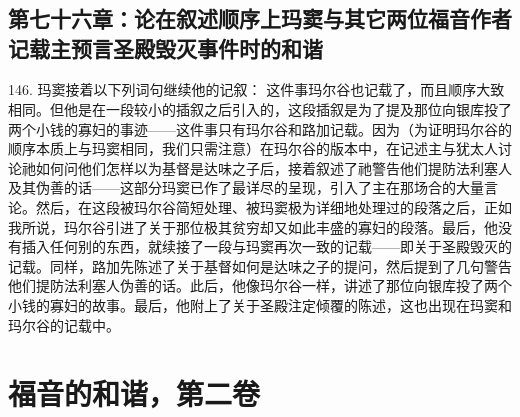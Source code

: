 
\section{}


\subsection{第七十六章：论在叙述顺序上玛窦与其它两位福音作者记载主预言圣殿毁灭事件时的和谐}

146. 玛窦接着以下列词句继续他的记叙： 这件事玛尔谷也记载了，而且顺序大致相同。但他是在一段较小的插叙之后引入的，这段插叙是为了提及那位向银库投了两个小钱的寡妇的事迹——这件事只有玛尔谷和路加记载。因为（为证明玛尔谷的顺序本质上与玛窦相同，我们只需注意）在玛尔谷的版本中，在记述主与犹太人讨论祂如何问他们怎样以为基督是达味之子后，接着叙述了祂警告他们提防法利塞人及其伪善的话——这部分玛窦已作了最详尽的呈现，引入了主在那场合的大量言论。然后，在这段被玛尔谷简短处理、被玛窦极为详细地处理过的段落之后，正如我所说，玛尔谷引进了关于那位极其贫穷却又如此丰盛的寡妇的段落。最后，他没有插入任何别的东西，就续接了一段与玛窦再次一致的记载——即关于圣殿毁灭的记载。同样，路加先陈述了关于基督如何是达味之子的提问，然后提到了几句警告他们提防法利塞人伪善的话。此后，他像玛尔谷一样，讲述了那位向银库投了两个小钱的寡妇的故事。最后，他附上了关于圣殿注定倾覆的陈述，这也出现在玛窦和玛尔谷的记载中。\par



\section{福音的和谐，第二卷}


